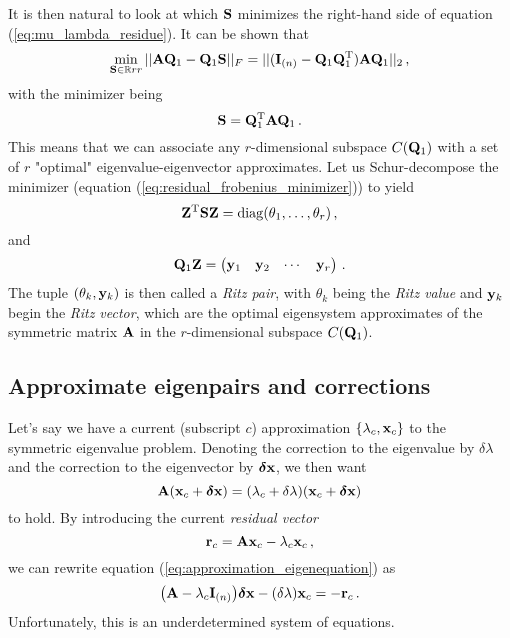     It is then natural to look at which $\vb{S}$ minimizes the right-hand side of equation (\ref{eq:mu_lambda_residue}). It can be shown that
    \begin{equation}
        \min_{\vb{S} \in \mathbb{R}{r}{r}} || \vb{A}\vb{Q}_1 - \vb{Q}_1 \vb{S} ||_F = || (\vb{I}_{(n)} - \vb{Q}_1 \vb{Q}_1^\text{T}) \vb{A}\vb{Q}_1 ||_2 \thinspace ,
    \end{equation}
    with the minimizer being
    \begin{equation} \label{eq:residual_frobenius_minimizer}
        \vb{S} = \vb{Q}_1^\text{T} \vb{A} \vb{Q}_1 \thinspace .
    \end{equation}
    This means that we can associate any $r$-dimensional subspace $C(\vb{Q}_1)$ with a set of $r$ "optimal" eigenvalue-eigenvector approximates. Let us Schur-decompose the minimizer (equation (\ref{eq:residual_frobenius_minimizer})) to yield
    \begin{equation}
        \vb{Z}^\text{T} \vb{S} \vb{Z} = \operatorname{diag}(\theta_1, \dots, \theta_r) \thinspace ,
    \end{equation}
    and
    \begin{equation}
        \vb{Q}_1 \vb{Z} = \begin{pmatrix} \vb{y}_1 & \vb{y}_2 & \cdots & \vb{y}_r \end{pmatrix} \thinspace .
    \end{equation}
    The tuple $(\theta_k, \vb{y}_k)$ is then called a \emph{Ritz pair}, with $\theta_k$ being the \emph{Ritz value} and $\vb{y}_k$ begin the \emph{Ritz vector}, which are the optimal eigensystem approximates of the symmetric matrix $\vb{A}$ in the $r$-dimensional subspace $C(\vb{Q}_1)$.

\subsection{Approximate eigenpairs and corrections}
    Let's say we have a current (subscript $c$) approximation $\qty{\lambda_c, \vb{x}_c}$ to the symmetric eigenvalue problem. Denoting the correction to the eigenvalue by $\delta\lambda$ and the correction to the eigenvector by $\boldsymbol{\delta} \vb{x}$, we then want
    \begin{equation} \label{eq:approximation_eigenequation}
        \vb{A} (\vb{x}_c + \boldsymbol{\delta} \vb{x}) = (\lambda_c + \delta\lambda)(\vb{x}_c + \boldsymbol{\delta} \vb{x})
    \end{equation}
    to hold. By introducing the current \emph{residual vector}
    \begin{equation}
        \vb{r}_c = \vb{A} \vb{x}_c - \lambda_c \vb{x}_c \thinspace ,
    \end{equation}
    we can rewrite equation (\ref{eq:approximation_eigenequation}) as
    \begin{equation} \label{eq:residual_vector_equation}
        \qty(\vb{A} - \lambda_c \vb{I}_{(n)}) \boldsymbol{\delta} \vb{x} - (\delta\lambda) \vb{x}_c = - \vb{r}_c \thinspace .
    \end{equation}
    Unfortunately, this is an underdetermined system of equations.


